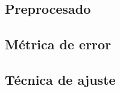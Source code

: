 \documentclass[a4paper, 20pt]{article}
\begin{document}
\subsection{Preprocesado}


\subsection{Métrica de error}

\subsection{Técnica de ajuste}


\end{document}
